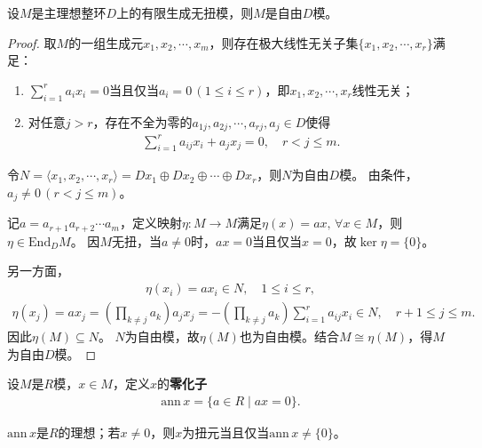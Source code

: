 \documentclass[../../main.tex]{subfiles}%
\begin{document}
\begin{theorem}
设$M$是主理想整环$D$上的有限生成无扭模，则$M$是自由$D$模。
\end{theorem}
\begin{proof}
取$M$的一组生成元$x_1,x_2,\cdots,x_m$，则存在极大线性无关子集$\{x_1,x_2,\cdots,x_r\}$满足：
\begin{enumerate}[(1)]
\item $\sum_{i=1}^{r}a_ix_i=0$当且仅当$a_i=0\,(1\leqslant i\leqslant r)$，即$x_1,x_2,\cdots,x_r$线性无关；
\item 对任意$j>r$，存在不全为零的$a_{1j},a_{2j},\cdots,a_{rj},a_j\in D$使得
\begin{align}\label{eq:5.3.2}
\sum_{i=1}^{r}a_{ij}x_i+a_jx_j=0,\quad r<j\leqslant m.
\end{align}
\end{enumerate}

令$N=\langle x_1,x_2,\cdots,x_r\rangle=Dx_1\oplus Dx_2\oplus\cdots\oplus Dx_r$，则$N$为自由$D$模。
由条件，$a_j\neq0\,(r<j\leqslant m)$。

记$a=a_{r+1}a_{r+2}\cdots a_m$，定义映射$\eta:M\to M$满足$\eta(x)=ax,\,\forall x\in M$，则$\eta\in\mathrm{End}_D M$。
因$M$无扭，当$a\neq0$时，$ax=0$当且仅当$x=0$，故$\ker\eta=\{0\}$。

另一方面，
\begin{align*}
\eta(x_i)=ax_i\in N,\quad 1\leqslant i\leqslant r,
\end{align*}
\begin{align*}
\eta(x_j)=ax_j=\left(\prod_{k\neq j}a_k\right)a_jx_j=-\left(\prod_{k\neq j}a_k\right)\sum_{i=1}^{r}a_{ij}x_i\in N,\quad r+1\leqslant j\leqslant m.
\end{align*}
因此$\eta(M)\subseteq N$。
$N$为自由模，故$\eta(M)$也为自由模。结合$M\cong\eta(M)$，得$M$为自由$D$模。
\end{proof}

\begin{definition}
设$M$是$R$模，$x\in M$，定义$x$的\textbf{零化子}
\begin{align*}
\mathrm{ann}\,x=\{a\in R\mid ax=0\}.
\end{align*}
\end{definition}

\begin{remark}
$\mathrm{ann}\,x$是$R$的理想；若$x\neq0$，则$x$为扭元当且仅当$\mathrm{ann}\,x\neq\{0\}$。
\end{remark}
\end{document}
